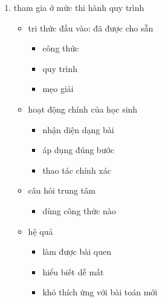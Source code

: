 \documentclass[
  10pt,
  a4paper,
  landscape,
  twoside,
  openany
]{scrbook}
\begin{document}
{{\begin{enumerate}
  \item tham gia ở mức thi hành quy trình
    \begin{itemize}
      \item tri thức đầu vào: đã được cho sẵn
        \begin{itemize}
          \item công thức
          \item quy trình
          \item mẹo giải
        \end{itemize}
      \item hoạt động chính của học sinh
        \begin{itemize}
          \item nhận diện dạng bài
          \item áp dụng đúng bước
          \item thao tác chính xác
        \end{itemize}
      \item câu hỏi trung tâm
        \begin{itemize}
          \item dùng công thức nào
        \end{itemize}
      \item hệ quả
        \begin{itemize}
          \item làm được bài quen
          \item hiểu biết dễ mất
          \item khó thích ứng với bài toán mới
        \end{itemize}
    \end{itemize}


\end{enumerate}}}
\end{document}
